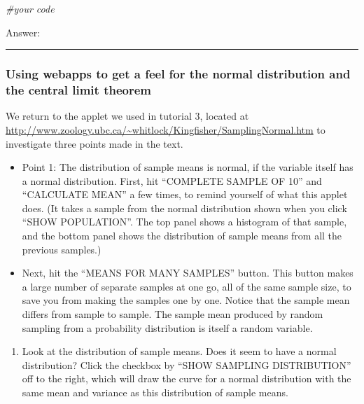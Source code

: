 \documentclass[
]{article}
\newenvironment{Shaded}{\begin{snugshade}}{\end{snugshade}}
\newcommand{\CommentTok}[1]{\textcolor[rgb]{0.56,0.35,0.01}{\textit{#1}}}
\providecommand{\tightlist}{%
  \setlength{\itemsep}{0pt}\setlength{\parskip}{0pt}}
\begin{document}
\begin{Shaded}
\begin{Highlighting}[]
\CommentTok{\#your code}
\end{Highlighting}
\end{Shaded}

Answer:

\begin{center}\rule{0.5\linewidth}{0.5pt}\end{center}

\hypertarget{using-webapps-to-get-a-feel-for-the-normal-distribution-and-the-central-limit-theorem}{%
\subsubsection{Using webapps to get a feel for the normal distribution
and the central limit
theorem}\label{using-webapps-to-get-a-feel-for-the-normal-distribution-and-the-central-limit-theorem}}

We return to the applet we used in tutorial 3, located at
\url{http://www.zoology.ubc.ca/~whitlock/Kingfisher/SamplingNormal.htm}
to investigate three points made in the text.

\begin{itemize}
\item
  Point 1: The distribution of sample means is normal, if the variable
  itself has a normal distribution. First, hit ``COMPLETE SAMPLE OF 10''
  and ``CALCULATE MEAN'' a few times, to remind yourself of what this
  applet does. (It takes a sample from the normal distribution shown
  when you click ``SHOW POPULATION''. The top panel shows a histogram of
  that sample, and the bottom panel shows the distribution of sample
  means from all the previous samples.)
\item
  Next, hit the ``MEANS FOR MANY SAMPLES'' button. This button makes a
  large number of separate samples at one go, all of the same sample
  size, to save you from making the samples one by one. Notice that the
  sample mean differs from sample to sample. The sample mean produced by
  random sampling from a probability distribution is itself a random
  variable.
\end{itemize}

\begin{enumerate}
\def\labelenumi{\Alph{enumi})}
\tightlist
\item
  Look at the distribution of sample means. Does it seem to have a
  normal distribution? Click the checkbox by ``SHOW SAMPLING
  DISTRIBUTION'' off to the right, which will draw the curve for a
  normal distribution with the same mean and variance as this
  distribution of sample means.
\end{enumerate}
\end{document}
